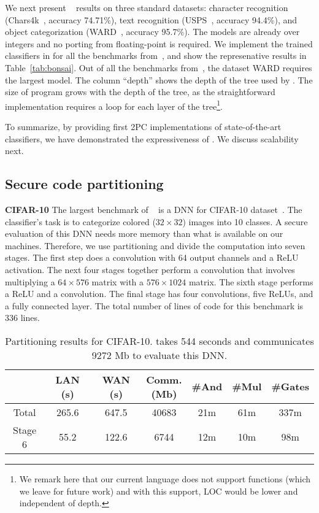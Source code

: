 We next present \bonsai~\cite{bonsai} results on three
standard datasets: character recognition (Chars4k~\cite{campos},
accuracy 74.71\%), text recognition (USPS~\cite{hull}, accuracy
94.4\%), and object categorization (WARD~\cite{yang}, accuracy
95.7\%). 
The \bonsai models are already over integers and no porting from
floating-point is required.
We implement the trained classifiers in \tool for all the benchmarks
from~\cite{bonsai},
and show the represenative results in Table~\ref{tab:bonsai}.
Out of all the benchmarks from~\cite{bonsai}, the dataset WARD
requires the largest model. 
The column ``depth''  shows the depth of the
tree used by \bonsai. The size of \tool 
program grows with the depth of the tree, as the straightforward \tool
implementation requires a loop for each layer of the
tree\footnote{We remark here that our current language does not support functions (which we leave for future work) and with this support, LOC would be lower and independent of depth.}. 

To summarize, by providing first 2PC implementations of
state-of-the-art classifiers, we have demonstrated the expressiveness
of \tool. We discuss scalability next.


\setlength\tabcolsep{6pt}
\subsection{Secure code partitioning}
\label{sec:pipeeval}
\noindent\textbf{CIFAR-10}
The largest benchmark of \minion~\cite{minionn} is a DNN for CIFAR-10
dataset~\cite{cifar}. 
The classifier's task is to categorize colored ($32\times 32$) images
into 10 classes. A secure evaluation of this DNN needs more memory
than what is available
on our machines. Therefore, we use partitioning and divide the
computation into seven stages. 
The first step does a convolution with 64 output channels and a ReLU
activation. The next four stages together perform a convolution that
involves multiplying a $64\times 576$ matrix with a 
$576\times 1024$ matrix. The sixth stage performs a ReLU and a
convolution. The final stage has four convolutions, five ReLUs, and a
fully connected layer. The total number of lines of \tool code for
this benchmark is 336 lines.

\begin{table}
\begin{tabular}{|c|c|c|c |c|c|c|}
\hline
           &  LAN (s) & WAN (s) & \thead{Comm. \\ (Mb)}  & \#And & \#Mul & \#Gates \\
\hline
Total      &  265.6       & 647.5        & 40683       & 21m    & 61m    &  337m  \\
\hline
Stage 6    &  55.2        & 122.6        & 6744        & 12m    & 10m   &  98m  \\
\hline
\end{tabular}

 \caption{Partitioning results for CIFAR-10. \minion takes 544 seconds and communicates 9272 Mb to evaluate this DNN.}
 \label{tab:cifar} 
\end{table}

